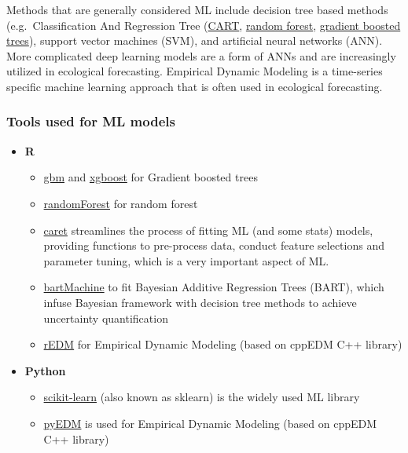 \documentclass[
]{book}
\providecommand{\tightlist}{%
  \setlength{\itemsep}{0pt}\setlength{\parskip}{0pt}}
\begin{document}
Methods that are generally considered ML include decision tree based methods (e.g.~Classification And Regression Tree (\href{https://en.wikipedia.org/wiki/Decision_tree_learning}{CART}, \href{https://en.wikipedia.org/wiki/Random_forest}{random forest}, \href{https://en.wikipedia.org/wiki/Gradient_boosting\#Gradient_tree_boosting}{gradient boosted trees}), support vector machines (SVM), and artificial neural networks (ANN). More complicated deep learning models are a form of ANNs and are increasingly utilized in ecological forecasting. Empirical Dynamic Modeling is a time-series specific machine learning approach that is often used in ecological forecasting.

\hypertarget{tools-used-for-ml-models}{%
\subsubsection{Tools used for ML models}\label{tools-used-for-ml-models}}

\begin{itemize}
\tightlist
\item
  \textbf{R}

  \begin{itemize}
  \tightlist
  \item
    \href{https://cran.r-project.org/web/packages/gbm/index.html}{gbm} and \href{https://cran.r-project.org/web/packages/xgboost/index.html}{xgboost} for Gradient boosted trees
  \item
    \href{https://cran.r-project.org/web/packages/randomForest/index.html}{randomForest} for random forest
  \item
    \href{https://cran.r-project.org/web/packages/caret/}{caret} streamlines the process of fitting ML (and some stats) models, providing functions to pre-process data, conduct feature selections and parameter tuning, which is a very important aspect of ML.
  \item
    \href{https://cran.r-project.org/web/packages/bartMachine/index.html}{bartMachine} to fit Bayesian Additive Regression Trees (BART), which infuse Bayesian framework with decision tree methods to achieve uncertainty quantification
  \item
    \href{https://cran.r-project.org/web/packages/rEDM/index.html}{rEDM} for Empirical Dynamic Modeling (based on cppEDM C++ library)
  \end{itemize}
\item
  \textbf{Python}

  \begin{itemize}
  \tightlist
  \item
    \href{https://scikit-learn.org/stable/}{scikit-learn} (also known as sklearn) is the widely used ML library
  \item
    \href{https://pypi.org/project/pyEDM/}{pyEDM} is used for Empirical Dynamic Modeling (based on cppEDM C++ library)
  \end{itemize}
\end{itemize}
\end{document}

